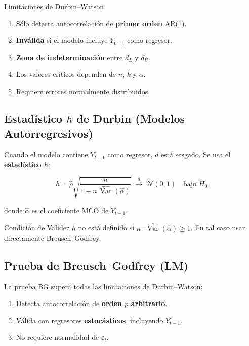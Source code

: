 \documentclass[11pt, letterpaper]{article}
\begin{document}
\begin{nota}{Limitaciones de Durbin--Watson}
\begin{enumerate}
  \item S\'olo detecta autocorrelaci\'on de \textbf{primer orden} AR(1).
  \item \textbf{Inv\'alida} si el modelo incluye $Y_{t-1}$ como regresor.
  \item \textbf{Zona de indeterminaci\'on} entre $d_L$ y $d_U$.
  \item Los valores cr\'iticos dependen de $n$, $k$ y $\alpha$.
  \item Requiere errores normalmente distribuidos.
\end{enumerate}
\end{nota}

\subsection{Estad\'istico $h$ de Durbin (Modelos Autorregresivos)}

Cuando el modelo contiene $Y_{t-1}$ como regresor, $d$ est\'a sesgado.
Se usa el \textbf{estad\'istico $h$}:

\[
  h = \hat\rho \sqrt{\frac{n}{1 - n\,\widehat{\operatorname{Var}}(\hat\alpha)}}
  \;\xrightarrow{d}\; \mathcal{N}(0,1) \quad\text{bajo }H_0
\]

donde $\hat\alpha$ es el coeficiente MCO de $Y_{t-1}$.

\begin{nota}{Condici\'on de Validez}
$h$ no est\'a definido si $n\cdot\widehat{\operatorname{Var}}(\hat\alpha)\geq 1$.
En tal caso usar directamente Breusch--Godfrey.
\end{nota}

\subsection{Prueba de Breusch--Godfrey (LM)}

La prueba BG supera todas las limitaciones de Durbin--Watson:
\begin{enumerate}
  \item Detecta autocorrelaci\'on de \textbf{orden $p$ arbitrario}.
  \item V\'alida con regresores \textbf{estoc\'asticos}, incluyendo $Y_{t-1}$.
  \item No requiere normalidad de $\varepsilon_t$.
\end{enumerate}
\end{document}
